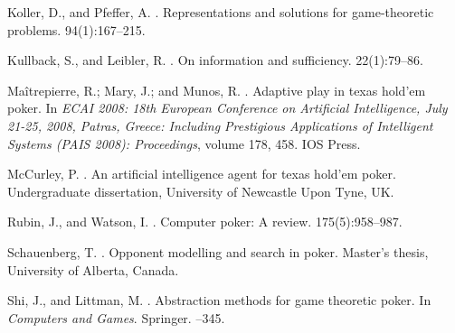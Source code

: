 \documentclass[letterpaper]{article}
\begin{document}
\begin{thebibliography}{}
Koller, D., and Pfeffer, A.
.
\newblock Representations and solutions for game-theoretic problems.
 94(1):167--215.

Kullback, S., and Leibler, R.
.
\newblock On information and sufficiency.
 22(1):79--86.

Maîtrepierre, R.; Mary, J.; and Munos, R.
.
\newblock Adaptive play in texas hold’em poker.
\newblock In {\em ECAI 2008: 18th European Conference on Artificial
  Intelligence, July 21-25, 2008, Patras, Greece: Including Prestigious
  Applications of Intelligent Systems (PAIS 2008): Proceedings}, volume 178,
  458.
\newblock IOS Press.

McCurley, P.
.
\newblock An artificial intelligence agent for texas hold’em poker.
\newblock Undergraduate dissertation, University of Newcastle Upon Tyne, UK.

Rubin, J., and Watson, I.
.
\newblock Computer poker: A review.
 175(5):958--987.

Schauenberg, T.
.
\newblock Opponent modelling and search in poker.
\newblock Master's thesis, University of Alberta, Canada.

Shi, J., and Littman, M.
.
\newblock Abstraction methods for game theoretic poker.
\newblock In {\em Computers and Games}. Springer.
--345.

\end{thebibliography}
\end{document}
